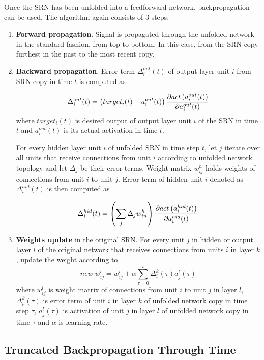 \documentclass[12pt,oneside]{fithesis2}
\begin{document}
Once the SRN has been unfolded into a feedforward network, backpropagation can be used. The algorithm again consists of 3 steps:
\begin{enumerate}
  \item \textbf{Forward propagation}. Signal is propagated through the unfolded network in the standard fashion, from top to bottom. In this case, from the SRN copy furthest in the past to the most recent copy.
  \item \textbf{Backward propagation}. Error term $\Delta^{out}_{i}(t)$ of output layer unit $i$ from SRN copy in time $t$ is computed as
 
  $$\Delta^{out}_{i}(t) = \left(target_{i}(t) - a^{out}_{i}(t)\right) {{\partial{act\left(a^{out}_{i}(t)\right)}} \over {\partial a^{out}_{i}(t)}}$$
 where $target_i(t)$ is desired output of output layer unit $i$ of the SRN in time $t$ and $a^{out}_{i}(t)$ is its actual activation in time $t$.
 
  For every hidden layer unit $i$ of unfolded SRN in time step $t$, let $j$ iterate over all units that receive connections from unit $i$ according to unfolded network topology and let $\Delta_j$ be their error terms. Weight matrix $w_{ij}^h$ holds weights of connections from unit $i$ to unit $j$. Error term of hidden unit $i$ denoted as $\Delta^{hid}_{i}(t)$ is then computed as

  $$\Delta^{hid}_{i}(t) =\left(\sum\limits_{j} \Delta_{j}w_{in}^{h}\right) {{\partial{act\left(a^{hid}_{i}(t)\right)}} \over {\partial a^{hid}_{i}(t)}}$$
  
  \item \textbf{Weights update} in the original SRN. For every unit $j$ in hidden or output layer $l$ of the original network that receives connections from units $i$ in layer $k$, update the weight according to
  $$new \; w_{ij}^l = w_{ij}^l + \alpha \sum\limits_{\tau=0}^{t} \Delta_i^{k}\left(\tau\right) a_{j}^{l}\left(\tau\right)$$
where $w_{ij}^l$ is weight matrix of connections from unit $i$ to unit $j$ in layer $l$, $\Delta_i^{k}(\tau)$ is error term of unit $i$ in layer $k$ of unfolded network copy in time step $\tau$, $a_{j}^{l}(\tau)$ is activation of unit $j$ in layer $l$ of unfolded network copy in time $\tau$ and $\alpha$ is learning rate.
\end{enumerate}


\subsection{Truncated Backpropagation Through Time}
\end{document}
